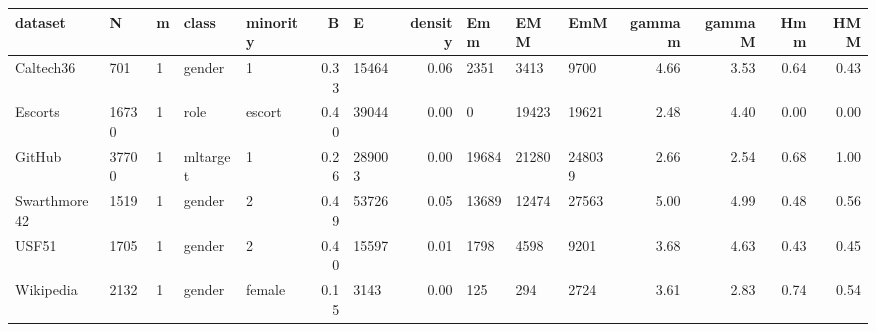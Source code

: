 \begin{tabular}{lllllrlrlllrrrr}
\toprule
      dataset &      N &  m &     class & minority &    B &       E &  density &    Emm &    EMM &     EmM &  gammam &  gammaM &  Hmm &  HMM \\
\midrule
    Caltech36 &    701 &  1 &    gender &        1 & 0.33 &   15464 &     0.06 &   2351 &   3413 &    9700 &    4.66 &    3.53 & 0.64 & 0.43 \\
      Escorts &  16730 &  1 &      role &   escort & 0.40 &   39044 &     0.00 &      0 &  19423 &   19621 &    2.48 &    4.40 & 0.00 & 0.00 \\
       GitHub &  37700 &  1 &  mltarget &        1 & 0.26 &  289003 &     0.00 &  19684 &  21280 &  248039 &    2.66 &    2.54 & 0.68 & 1.00 \\
 Swarthmore42 &   1519 &  1 &    gender &        2 & 0.49 &   53726 &     0.05 &  13689 &  12474 &   27563 &    5.00 &    4.99 & 0.48 & 0.56 \\
        USF51 &   1705 &  1 &    gender &        2 & 0.40 &   15597 &     0.01 &   1798 &   4598 &    9201 &    3.68 &    4.63 & 0.43 & 0.45 \\
    Wikipedia &   2132 &  1 &    gender &   female & 0.15 &    3143 &     0.00 &    125 &    294 &    2724 &    3.61 &    2.83 & 0.74 & 0.54 \\
\bottomrule
\end{tabular}
